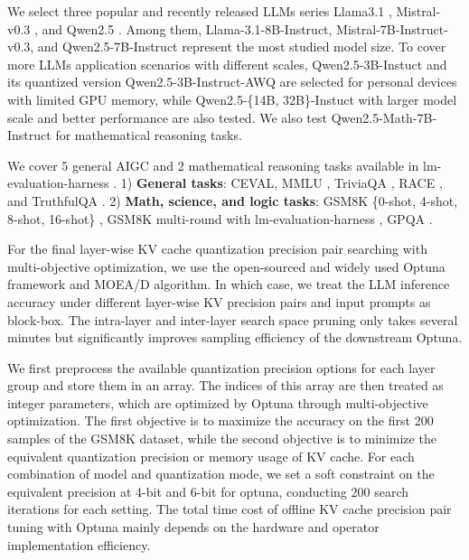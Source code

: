 We select three popular and recently released LLMs series Llama3.1 \cite{dubey2024llama3.1}, Mistral-v0.3 \cite{jiang2023mistral}, and Qwen2.5 \cite{yang2024qwen2.5}. Among them, Llama-3.1-8B-Instruct, Mistral-7B-Instruct-v0.3, and Qwen2.5-7B-Instruct represent the most studied model size. To cover more LLMs application scenarios with different scales, Qwen2.5-3B-Instuct and its quantized version Qwen2.5-3B-Instruct-AWQ are selected for personal devices with limited GPU memory, while Qwen2.5-\{14B, 32B\}-Instuct with larger model scale and better performance are also tested. We also test Qwen2.5-Math-7B-Instruct for mathematical reasoning tasks.

We cover 5 general AIGC and 2 mathematical reasoning tasks available in lm-evaluation-harness 
. 1) \textbf{General tasks}: CEVAL\cite{huang2024ceval}, MMLU \cite{hendrycks2020mmlu}, TriviaQA \cite{joshi2017triviaqa}, RACE \cite{lai2017race}, and TruthfulQA \cite{lin2021truthfulqa}. 2) \textbf{Math, science, and logic tasks}: GSM8K \{0-shot, 4-shot, 8-shot, 16-shot\} \cite{cobbe2021gsm8k}, GSM8K multi-round with lm-evaluation-harness \cite{eval-harness}, GPQA \cite{rein2023gpqa}. 

For the final layer-wise KV cache quantization precision pair searching with multi-objective optimization, we use the open-sourced and widely used Optuna framework \cite{akiba2019optuna} and MOEA/D \cite{zhang2007moea} algorithm. In which case, we treat the LLM inference accuracy under different layer-wise KV precision pairs and input prompts as block-box. The intra-layer and inter-layer search space pruning only takes several minutes but significantly improves sampling efficiency of the downstream Optuna.

We first preprocess the available quantization precision options for each layer group and store them in an array. The indices of this array are then treated as integer parameters, which are optimized by Optuna through multi-objective optimization. The first objective is to maximize the accuracy on the first 200 samples of the GSM8K dataset, while the second objective is to minimize the equivalent quantization precision or memory usage of KV cache.
For each combination of model and quantization mode, we set a soft constraint on the equivalent precision at 4-bit and 6-bit for optuna, conducting 200 search iterations for each setting. The total time cost of offline KV cache precision pair tuning with Optuna mainly depends on the hardware and operator implementation efficiency.

